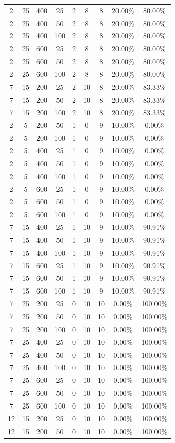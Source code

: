{\begin{longtable}{| c | c | c | c | c | c | c | c | c |}
2&25&400&25&2&8&8&20.00\%&80.00\%\\
2&25&400&50&2&8&8&20.00\%&80.00\%\\
2&25&400&100&2&8&8&20.00\%&80.00\%\\
2&25&600&25&2&8&8&20.00\%&80.00\%\\
2&25&600&50&2&8&8&20.00\%&80.00\%\\
2&25&600&100&2&8&8&20.00\%&80.00\%\\
7&15&200&25&2&10&8&20.00\%&83.33\%\\
7&15&200&50&2&10&8&20.00\%&83.33\%\\
7&15&200&100&2&10&8&20.00\%&83.33\%\\
2&5&200&50&1&0&9&10.00\%&0.00\%\\
2&5&200&100&1&0&9&10.00\%&0.00\%\\
2&5&400&25&1&0&9&10.00\%&0.00\%\\
2&5&400&50&1&0&9&10.00\%&0.00\%\\
2&5&400&100&1&0&9&10.00\%&0.00\%\\
2&5&600&25&1&0&9&10.00\%&0.00\%\\
2&5&600&50&1&0&9&10.00\%&0.00\%\\
2&5&600&100&1&0&9&10.00\%&0.00\%\\
7&15&400&25&1&10&9&10.00\%&90.91\%\\
7&15&400&50&1&10&9&10.00\%&90.91\%\\
7&15&400&100&1&10&9&10.00\%&90.91\%\\
7&15&600&25&1&10&9&10.00\%&90.91\%\\
7&15&600&50&1&10&9&10.00\%&90.91\%\\
7&15&600&100&1&10&9&10.00\%&90.91\%\\
7&25&200&25&0&10&10&0.00\%&100.00\%\\
7&25&200&50&0&10&10&0.00\%&100.00\%\\
7&25&200&100&0&10&10&0.00\%&100.00\%\\
7&25&400&25&0&10&10&0.00\%&100.00\%\\
7&25&400&50&0&10&10&0.00\%&100.00\%\\
7&25&400&100&0&10&10&0.00\%&100.00\%\\
7&25&600&25&0&10&10&0.00\%&100.00\%\\
7&25&600&50&0&10&10&0.00\%&100.00\%\\
7&25&600&100&0&10&10&0.00\%&100.00\%\\
12&15&200&25&0&10&10&0.00\%&100.00\%\\
12&15&200&50&0&10&10&0.00\%&100.00\%\\

\end{longtable}}
